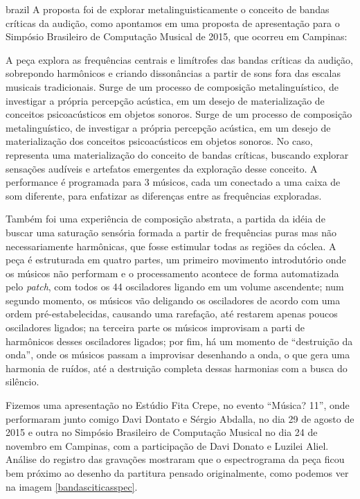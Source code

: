 \begin{otherlanguage*}{brazil}
A proposta foi de explorar metalinguisticamente o conceito de bandas críticas da audição, como apontamos em uma proposta de apresentação para o Simpósio Brasileiro de Computação Musical de 2015, que ocorreu em Campinas:


\begin{citacao}
A peça explora as frequências centrais e limítrofes das bandas críticas da audição, sobrepondo harmônicos e criando dissonâncias a partir de sons fora das escalas musicais tradicionais. Surge de um processo de composição metalinguístico, de investigar a própria percepção acústica, em um desejo de materialização de conceitos psicoacústicos em objetos sonoros.
Surge de um processo de composição metalinguístico, de investigar a própria percepção acústica, em um desejo de materialização dos conceitos psicoacústicos em objetos sonoros. No caso, representa uma materialização do conceito de bandas críticas, buscando explorar sensações audíveis e artefatos emergentes da exploração desse conceito. A performance é programada para 3 músicos, cada um conectado a uma caixa de som diferente, para enfatizar as diferenças entre as frequências exploradas. \cite{ArianeStolfi2015}
\end{citacao}

Também foi uma experiência de composição abstrata, a partida da idéia de buscar uma saturação sensória formada a partir de frequências puras mas não necessariamente harmônicas, que fosse estimular todas as regiões da cóclea. A peça é estruturada em quatro partes, um primeiro movimento introdutório onde os músicos não performam e o processamento acontece de forma automatizada pelo \emph{patch}, com todos os 44 osciladores ligando em um volume ascendente; num segundo momento, os músicos vão deligando os osciladores de acordo com uma ordem pré-estabelecidas, causando uma rarefação, até restarem apenas poucos osciladores ligados; na terceira parte os músicos improvisam a parti de harmônicos desses osciladores ligados; por fim, há um momento de ``destruição da onda'', onde os músicos passam a improvisar desenhando a onda, o que gera uma harmonia de ruídos, até a destruição completa dessas harmonias com a busca do silêncio.

Fizemos uma apresentação no Estúdio Fita Crepe, no evento ``Música? 11'', onde performaram junto comigo Davi Dontato e Sérgio Abdalla, no dia 29 de agosto de 2015 e outra no Simpósio Brasileiro de Computação Musical no dia 24 de novembro em Campinas, com a participação de Davi Donato e Luzilei Aliel. Análise do registro das gravações mostraram que o espectrograma da peça ficou bem próximo ao desenho da partitura pensado originalmente, como podemos ver na imagem \ref{bandasciticasspec}. 


\end{otherlanguage*}
